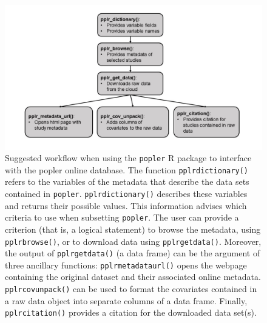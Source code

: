 \documentclass{article}\usepackage[]{graphicx}\usepackage[]{color}
\begin{document}
\newpage
\begin{figure}[h!]
  \begin{center}
    \includegraphics[scale=0.4]{pack_funs}
    \caption{Suggested workflow when using the \texttt{popler} R package to interface with the popler online database. The function \texttt{pplr\textunderscore dictionary()} refers to the variables of the metadata that describe the data sets contained in \texttt{popler}. \texttt{pplr\textunderscore dictionary()} describes these variables and returns their possible values. This information advises which criteria to use when subsetting \texttt{popler}. The user can provide a criterion (that is, a logical statement) to browse the metadata, using \texttt{pplr\textunderscore browse()}, or to download data using \texttt{pplr\textunderscore get\textunderscore data()}. Moreover, the output of \texttt{pplr\textunderscore get\textunderscore data()} (a data frame) can be the argument of three ancillary functions: \texttt{pplr\textunderscore metadata\textunderscore url()} opens the webpage containing the original dataset and their associated online metadata. \texttt{pplr\textunderscore cov\textunderscore unpack()} can be used to format the covariates contained in a raw data object into separate columns of a data frame. Finally, \texttt{pplr\textunderscore citation()} provides a citation for the downloaded data set(s).}
    \label{Fig:pack_funs}
  \end{center}
\end{figure}

\end{document}
